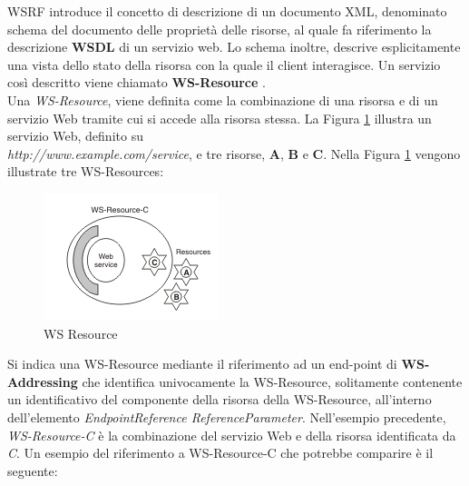 \documentclass[11pt]{article}
\begin{document}
WSRF introduce il concetto di descrizione di un documento XML, denominato schema del documento delle proprietà delle risorse, al quale fa riferimento la descrizione \textbf{WSDL} di un servizio web. Lo schema inoltre, descrive esplicitamente una vista dello stato della risorsa con la quale il client interagisce. Un servizio così descritto viene chiamato \textbf{WS-Resource} \cite{ogsadai}.\\

Una \emph{WS-Resource}, viene definita come la combinazione di una risorsa e di un servizio Web tramite cui si accede alla risorsa stessa. La Figura \ref{wsrf} illustra un servizio Web, definito su\\ \emph{http://www.example.com/service}, e tre risorse, \textbf{A}, \textbf{B} e \textbf{C}. Nella Figura \ref{wsrf} vengono illustrate tre WS-Resources:

\begin{figure}[H]
	\centering
	\includegraphics{images/wsresource.png}
	\caption{WS Resource}
	\label{wsrf}
\end{figure}

Si indica una WS-Resource mediante il riferimento ad un end-point di \textbf{WS-Addressing} che identifica univocamente la WS-Resource, solitamente contenente un identificativo del componente della risorsa della WS-Resource, all'interno dell'elemento \emph{EndpointReference ReferenceParameter}. Nell'esempio precedente, \emph{WS-Resource-C} è la combinazione del servizio Web e della risorsa identificata da \emph{C}. Un esempio del riferimento a WS-Resource-C che potrebbe comparire è il seguente:
\\
\end{document}
